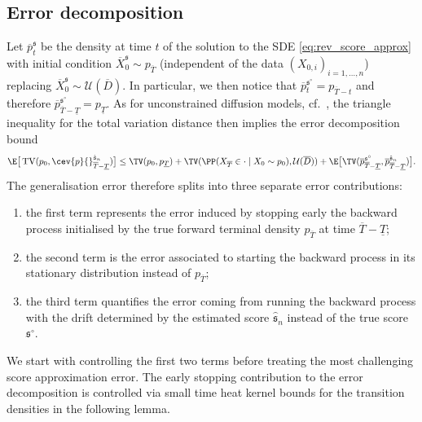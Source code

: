 \documentclass[a4paper, 11pt, headings = small, abstract]{scrartcl}
\begin{document}
\subsection{Error decomposition}\label{subsec:decomp}
Let $\overline{p}_t^{\mathfrak{s}}$ be the density at time $t$ of the solution to the SDE \eqref{eq:rev_score_approx} with initial condition $\overline{X}^{\mathfrak{s}}_0 \sim p_{\overline{T}}$ (independent of the data $(X_{0,i})_{i=1,\ldots,n}$) replacing $\overline{X}^{\mathfrak{s}}_0 \sim \mathcal{U}(\overline{D})$. In particular, we then notice that $\overline{p}{}^{\mathfrak{s}^\circ}_{t} = p_{\overline{T} - t}$ and therefore $\overline{p}{}^{\mathfrak{s}^\circ}_{\overline{T} - \underline{T}} = p_{ \underline{T}}$.  As for unconstrained diffusion models, cf.\ \cite{oko23}, the triangle inequality for the total variation distance then implies the error decomposition bound
\begin{equation}\label{eq:error_decomp}
\E\big[\operatorname{TV}(p_0,\cev{p}{}^{\hat{\mathfrak{s}}_n}_{\overline{T}- \underline{T}})\big] \leq \TV(p_0,p_{\underline{T}}) + \TV(\PP(X_{\overline{T}} \in \cdot \mid X_0 \sim p_0), \mathcal{U}(\overline{D})) + \E\big[\TV(\overline{p}{}^{\mathfrak{s}^\circ}_{\overline{T} - \underline{T}}, \overline{p}{}^{\hat{\mathfrak{s}}_n}_{\overline{T} - \underline{T}}) \big].
\end{equation}
The generalisation error therefore splits into three separate error contributions: 
\begin{enumerate} 
\item the first term represents the error induced by stopping early the backward process initialised by the true forward terminal density $p_{\overline{T}}$  at time $\overline{T} - \underline{T}$; 
\item the second term is the error associated to starting the backward process in its stationary distribution instead of $p_{\overline{T}}$;
\item the third term quantifies the error coming from running the backward process with the drift determined by the estimated score $\hat{\mathfrak{s}}_n$ instead of the true score $\mathfrak{s}^\circ$. 
\end{enumerate}
We start with controlling the first two terms before treating the most challenging score approximation error. The early stopping contribution to the error decomposition is controlled via small time heat kernel bounds for the transition densities in the following lemma.
\end{document}
